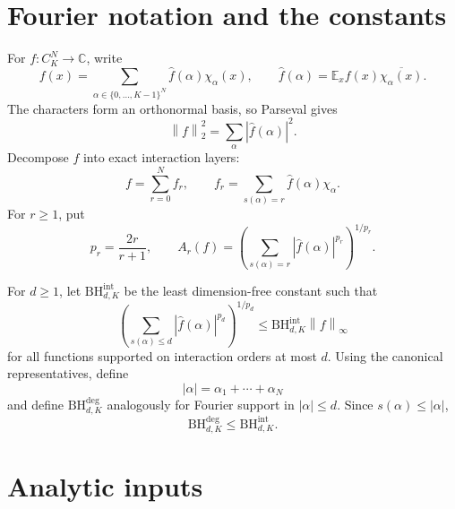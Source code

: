 \documentclass[11pt]{article}
\theoremstyle{definition}
\theoremstyle{remark}
\newcommand{\E}{\mathbb{E}}
\newcommand{\C}{\mathbb{C}}
\newcommand{\wh}{\widehat}
\newcommand{\norm}[1]{\left\lVert #1\right\rVert}
\newcommand{\abs}[1]{\left\lvert #1\right\rvert}
\newcommand{\BH}{\mathrm{BH}}
\begin{document}

\section{Fourier notation and the constants}

For $f:C_K^N\to\C$, write
\begin{equation}
\label{eq:fourier}
 f(x)=\sum_{\alpha\in\{0,\ldots,K-1\}^N}
 \wh f(\alpha)\chi_\alpha(x),
 \qquad
 \wh f(\alpha)=\E_x f(x)\overline{\chi_\alpha(x)}.
\end{equation}
The characters form an orthonormal basis, so Parseval gives
\begin{equation}
\label{eq:parseval}
 \norm f_2^2=\sum_\alpha\abs{\wh f(\alpha)}^2.
\end{equation}
Decompose $f$ into exact interaction layers:
\begin{equation}
\label{eq:layers}
 f=\sum_{r=0}^N f_r,
 \qquad
 f_r=\sum_{s(\alpha)=r}\wh f(\alpha)\chi_\alpha.
\end{equation}
For $r\ge1$, put
\begin{equation}
\label{eq:pr-Ar}
 p_r=\frac{2r}{r+1},
 \qquad
 A_r(f)=
 \left(\sum_{s(\alpha)=r}
 \abs{\wh f(\alpha)}^{p_r}\right)^{1/p_r}.
\end{equation}

For $d\ge1$, let $\BH^{\mathrm{int}}_{d,K}$ be the least dimension-free
constant such that
\begin{equation}
\label{eq:BH-int-def}
 \left(\sum_{s(\alpha)\le d}
 \abs{\wh f(\alpha)}^{p_d}\right)^{1/p_d}
 \le \BH^{\mathrm{int}}_{d,K}\norm f_\infty
\end{equation}
for all functions supported on interaction orders at most $d$.
Using the canonical representatives, define
\begin{equation}
\label{eq:total-degree}
 \abs\alpha=\alpha_1+\cdots+\alpha_N
\end{equation}
and define $\BH^{\deg}_{d,K}$ analogously for Fourier support in
$\abs\alpha\le d$.  Since $s(\alpha)\le\abs\alpha$,
\begin{equation}
\label{eq:degree-comparison}
 \BH^{\deg}_{d,K}\le\BH^{\mathrm{int}}_{d,K}.
\end{equation}

\section{Analytic inputs}
\end{document}
